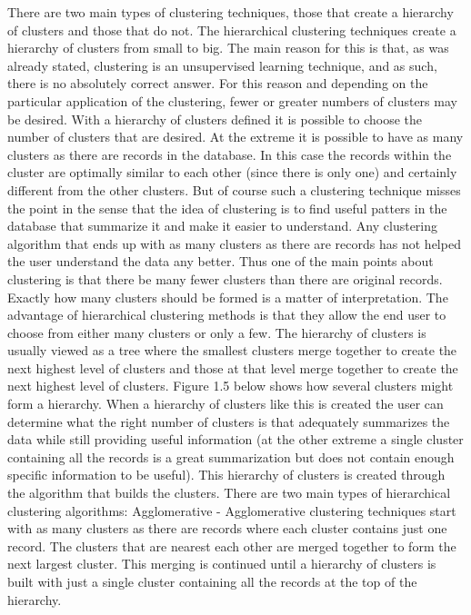 There are two main types of clustering techniques, those that create a hierarchy of clusters and those that do not.  The hierarchical clustering techniques create a hierarchy of clusters from small to big.  The main reason for this is that, as was already stated,  clustering is an unsupervised learning technique, and as such, there is no absolutely correct answer.  For this reason and depending on the particular application of the clustering, fewer or greater numbers of clusters may be desired.  With a hierarchy of clusters defined it is possible to choose the number of clusters that are desired.  At the extreme it is possible to have as many clusters as there are records in the database.   In this case the records within the cluster are optimally similar to each other (since there is only one) and certainly different from the other clusters.  But of course such a clustering technique misses the point in the sense that the idea of clustering is to find useful patters in the database that summarize it and make it easier to understand.  Any clustering algorithm that ends up with as many clusters as there are records has not helped the user understand the data any better.  Thus one of the main points about clustering is that there be many fewer clusters than there are original records.  Exactly how many clusters should be formed is a matter of interpretation.  The advantage of hierarchical clustering methods is that they allow the end user to choose from either many clusters or only a few.
The hierarchy of clusters is usually viewed as a tree where the smallest clusters merge together to create the next highest level of clusters and those at that level merge together to create the next highest level of clusters.  Figure 1.5 below shows how several clusters might form a hierarchy.  When a hierarchy of clusters like this is created the user can determine what the right number of clusters is that adequately summarizes the data while still providing useful information (at the other extreme a single cluster containing all the records is a great summarization but does not contain enough specific information to be useful).
This hierarchy of clusters is created through the algorithm that builds the clusters.  There are two main types of hierarchical clustering algorithms:
Agglomerative - Agglomerative clustering techniques start with as many clusters as there are records where each cluster contains just one record.   The clusters that are nearest each other are merged together to form the next largest cluster.  This merging is continued until a hierarchy of clusters is built with just a single cluster containing all the records at the top of the hierarchy.
